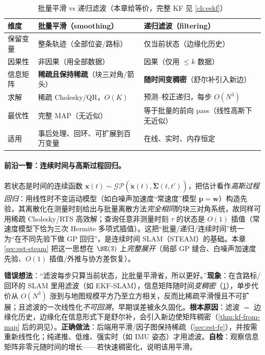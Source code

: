 \begin{table}[H]\centering\small
\caption{批量平滑 vs 递归滤波（本章给等价，完整 KF 见 \cref{ch:eskf}）}
\label{tab:est-batch-vs-recursive}
\begin{tabular}{lll}
\toprule
维度 & 批量平滑（smoothing） & 递归滤波（filtering） \\
\midrule
保留变量 & 整条轨迹（全部位姿/路标） & 仅当前状态（边缘化历史） \\
因果性 & 非因果（用全部数据） & 因果（仅用 $\le k$ 数据） \\
信息矩阵 & \textbf{稀疏且保持稀疏}（块三对角/箭头） & \textbf{随时间变稠密}（舒尔补引入新边） \\
求解 & 稀疏 Cholesky/QR，$O(K)$ & 预测–校正递归，每步 $O(N^3)$ \\
最优性 & 完整 MAP（无近似） & 等于批量的前向 pass（线性高斯下无近似） \\
适用 & 事后处理、回环、可扩展到百万变量 & 在线、实时、内存恒定 \\
\bottomrule
\end{tabular}
\end{table}

\paragraph{前沿一瞥：连续时间与高斯过程回归。}
若状态是时间的连续函数 $\mathbf{x}(t)\sim\mathcal{GP}(\check{\mathbf{x}}(t),\check{\boldsymbol{\Sigma}}(t,t'))$，把估计看作\emph{高斯过程回归}：用线性时不变运动模型（如白噪声加速度“常速度”模型 $\ddot{\mathbf{p}}=\mathbf{w}$）构造先验，其离散化在测量时刻给出与批量离散方法\emph{完全相同}的块三对角系统，故同样可用稀疏 Cholesky/RTS 高效解；查询任意非测量时刻 $\tau$ 的状态是 $O(1)$ 插值（常速度模型下恰为三次 Hermite 多项式插值）\cite{barfoot2024state}。这把“批量/递归/连续时间”统一为“在不同先验下做 GP 回归”，是连续时间 SLAM（STEAM）的基础。本章 \cref{sec:est-steam} 把这一思想在 $\SE(3)$ 上\emph{完整展开}（局部 GP 缝合、白噪声加速度先验、$O(1)$ 插值/外推与协方差恢复）。

\begin{pitfall}
\textbf{错误想法}：“滤波每步只算当前状态，比批量平滑省，所以更好。”\textbf{现象}：在含路标/回环的 SLAM 里用滤波（如 EKF-SLAM），信息矩阵随时间\emph{变稠密}（\cref{tab:est-batch-vs-recursive}），单步代价从 $O(N^3)$ 涨到与地图规模平方乃至立方相关，反而比稀疏平滑慢且不可扩展；且滤波的一次线性化\emph{不可回溯}，早期误差被永久固化。\textbf{根本原因}：滤波 $=$ 边缘化历史，边缘化在信息形式下是舒尔补，会引入新边使矩阵稠密（\cref{thm:kf-from-map} 后的洞见）。\textbf{正确做法}：后端用平滑/因子图保持稀疏（\cref{sec:est-fg}），并按需重新线性化；纯递推、低维、强实时（如 IMU 姿态）才用滤波。\textbf{自检}：观察信息矩阵非零元随时间的增长——若快速稠密化，说明该用平滑。
\end{pitfall}

